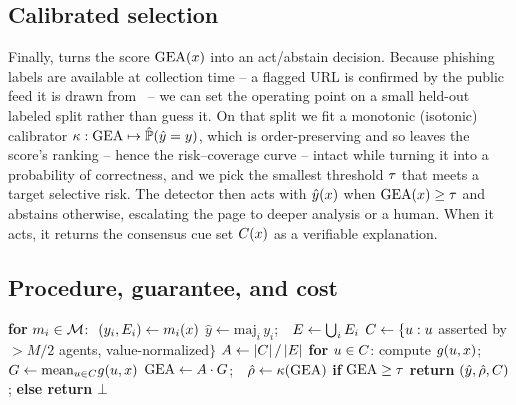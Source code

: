 \subsection{Calibrated selection}
\label{sec:select}
Finally, \toolname{} turns the score $\mathrm{GEA}(x)$ into an act/abstain decision.
Because phishing labels are available at collection time -- a flagged URL is confirmed
by the public feed it is drawn from~\cite{openphish,phishtank} -- we can set the
operating point on a small held-out labeled split rather than guess it. On that split
we fit a monotonic (isotonic) calibrator $\kappa:\mathrm{GEA}\mapsto\hat{\mathbb{P}}(\hat y = y)$,
which is order-preserving and so leaves the score's ranking -- hence the
risk--coverage curve -- intact while turning it into a probability of correctness, and
we pick the smallest threshold $\tau$ that meets a target selective risk. The detector
then acts with $\hat y(x)$ when $\mathrm{GEA}(x)\ge\tau$ and abstains otherwise,
escalating the page to deeper analysis or a human. When it acts, it returns the
consensus cue set $C(x)$ as a verifiable explanation.

\subsection{Procedure, guarantee, and cost}
\label{sec:algo}
\begin{algorithm}[!h]
\caption{\toolname{} inference on a page $\page$}
\label{alg:gea}
\begin{algorithmic}[1]
\State \textbf{for} $m_i\in\mathcal{M}$: $\ (y_i,E_i)\gets m_i(x)$
       \hfill{}
\State $\hat y\gets \mathrm{maj}_i\,y_i$;\ \
       $E\gets\bigcup_iE_i$ \hfill{}
\State $C\gets\{u: u$ asserted by $>\!M/2$ agents, value-normalized$\}$
\State $A\gets \lvert C\rvert\,/\,\lvert E\rvert$
       \hfill{}
\State \textbf{for} $u\in C$: compute $g(u,x)$;\ \
       $G\gets \mathrm{mean}_{u\in C}g(u,x)$
       \hfill\Comment{$C_3$, \eqref{eq:ground}}
\State $\mathrm{GEA}\gets A\cdot G$;\ \ $\hat\rho\gets\kappa(\mathrm{GEA})$
       \hfill\Comment{\eqref{eq:gea}}
\State \textbf{if} $\mathrm{GEA}\ge\tau$ \textbf{return} $(\hat y,\hat\rho,C)$;
       \textbf{else return} $\bot$
\end{algorithmic}
\end{algorithm}

